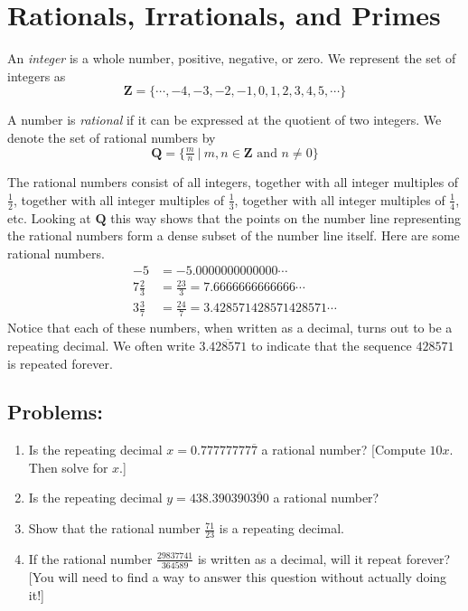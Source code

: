 \documentclass{article}
\newcommand\Q{\mathbf Q}
\newcommand\Z{\mathbf Z}
\newcommand{\0}{\mathbf 0}
\newcommand{\1}{\mathbf 1}
\begin{document}
\newpage

\section{Rationals, Irrationals, and Primes}


An \emph{integer} is a whole number, positive, negative, or zero. We represent the set of integers as
\begin{equation*}
\Z = \{ \cdots, -4, -3, -2, -1, 0, 1, 2, 3, 4, 5, \cdots \}
\end{equation*}

A number is \emph{rational} if it can be expressed at the quotient of two integers. We denote the set of rational numbers by
\begin{equation*}
\Q = \{ \tfrac{m}{n}\ |\ m,n \in \Z \text{ and } n \neq 0 \}
\end{equation*}

The rational numbers consist of all integers, together with all integer multiples of $\frac{1}{2}$, together with all integer multiples of $\frac{1}{3}$, together with all integer multiples of $\frac{1}{4}$, etc. Looking at $\Q$ this way shows that the points on the number line representing the rational numbers form a dense subset of the number line itself. Here are some rational numbers.
\begin{align*}
-5 &= -5.0000000000000\cdots \\
7 \tfrac{2}{3} &= \tfrac{23}{3} = 7.6666666666666\cdots \\
3 \tfrac{3}{7} &= \tfrac{24}{7} = 3.428571428571428571\cdots
\end{align*}
Notice that each of these numbers, when written as a decimal, turns
out to be a repeating decimal. We often write $3.\overline{428571}$ to indicate that the sequence $428571$ is repeated forever.


\subsection*{Problems:}

\begin{enumerate}
  \item Is the repeating decimal $x = 0.77777777\overline{7}$ a rational number? [Compute $10x$. Then solve for $x$.]
  \item Is the repeating decimal $y = 438.390390\overline{390}$ a rational number?
  \item Show that the rational number $\frac{71}{23}$ is a repeating decimal.
  \item If the rational number $\frac{29837741}{364589}$ is written as a decimal, will it repeat forever? [You will need to find a way to answer this question without actually doing it!]
\end{enumerate}
\end{document}
